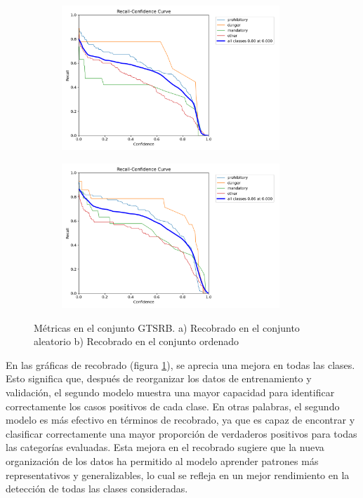 \documentclass{article}
\begin{document}
\begin{figure}[h]
\begin{subfigure}[b]{0.5\textwidth}
\centering
\includegraphics[width=0.9\textwidth]{resources/random cuban R curve.png}
\caption{}
\end{subfigure}
\begin{subfigure}[b]{0.5\textwidth}
\centering
\includegraphics[width=0.9\textwidth]{resources/sim cuban R curve.png}
\caption{}
\end{subfigure}
\caption{Métricas en el conjunto GTSRB. a) Recobrado en el conjunto aleatorio b) Recobrado en el conjunto ordenado}
\label{fig:recall random vs recall sim}
\end{figure}

En las gráficas de recobrado (figura \ref{fig:recall random vs recall sim}), se aprecia una mejora en todas las clases. Esto significa que, después de reorganizar los datos de entrenamiento y validación, el segundo modelo muestra una mayor capacidad para identificar correctamente los casos positivos de cada clase. En otras palabras, el segundo modelo es más efectivo en términos de recobrado, ya que es capaz de encontrar y clasificar correctamente una mayor proporción de verdaderos positivos para todas las categorías evaluadas. Esta mejora en el recobrado sugiere que la nueva organización de los datos ha permitido al modelo aprender patrones más representativos y generalizables, lo cual se refleja en un mejor rendimiento en la detección de todas las clases consideradas.
\end{document}

